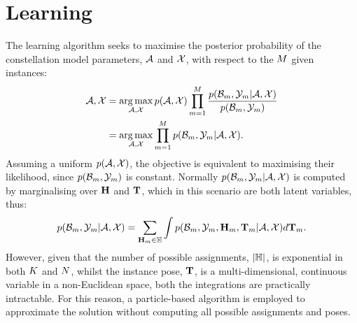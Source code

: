 \section{Learning}
The learning algorithm seeks to maximise the posterior probability of the constellation model parameters, $\mathcal{A}$ and $\mathcal{X}$, with respect to the $M$ given instances:  
\begin{equation}
	\begin{aligned}
		\mathcal{A},\mathcal{X} & = \operatorname*{arg\,max}_{\mathcal{A}, \mathcal{X}}
		p(\mathcal{A},\mathcal{X})
		\prod_{m=1}^M 
		\frac{p(\mathcal{B}_m,\mathcal{Y}_m|\mathcal{A},\mathcal{X})}{p(\mathcal{B}_m,\mathcal{Y}_m)} \\ 
		& = \operatorname*{arg\,max}_{\mathcal{A}, \mathcal{X}}
		\prod_{m=1}^M 
		p(\mathcal{B}_m,\mathcal{Y}_m|\mathcal{A},\mathcal{X}).
	\end{aligned}
\end{equation}
Assuming a uniform $p(\mathcal{A},\mathcal{X})$, the objective is equivalent to maximising their likelihood, since $p(\mathcal{B}_m,\mathcal{Y}_m)$ is constant.  
Normally $p(\mathcal{B}_m, \mathcal{Y}_m | \mathcal{A}, \mathcal{X})$ is computed by marginalising over $\mathbf{H}$ and $\mathbf{T}$, which in this scenario are both latent variables, thus:
\begin{equation}
	p(\mathcal{B}_m,\mathcal{Y}_m|\mathcal{A},\mathcal{X}) = 
	\sum_{\mathbf{H}_m \in \mathbb{H}}
	\displaystyle\int
	p(\mathcal{B}_m,\mathcal{Y}_m,\mathbf{H}_m,\mathbf{T}_m|\mathcal{A},\mathcal{X}) d\mathbf{T}_{m}.
	\label{eqn/reg/learningobjective}
\end{equation}
However, given that the number of possible assignments, $|\mathbb{H}|$, is exponential in both $K$ and $N$, whilst the instance pose, $\mathbf{T}$, is a multi-dimensional, continuous variable in a non-Euclidean space, both the integrations are practically intractable. For this reason, a particle-based algorithm is employed to approximate the solution without computing all possible assignments and poses.  

\def\spfparticlem{\particle_{\anyinstance}  =  \anyparticle}
\def\spfparticle{\particle  =  \anyparticle} 
